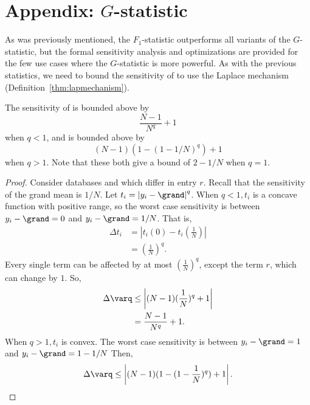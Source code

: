 \section{Appendix: $G$-statistic}\label{sec:Gapp}
As was previously mentioned, the $F_1$-statistic outperforms all variants of the $G$-statistic, but the formal sensitivity analysis and optimizations are provided for the few use cases where the $G$-statistic is more powerful. 
  As with the previous statistics, we need to bound the sensitivity of \varq to use the Laplace mechanism (Definition~\ref{thm:lapmechanism}).

\begin{theorem} \label{thm:varqSens} 
The sensitivity of \varq is bounded above by
$$ \frac{N-1}{N^q} + 1 $$
when $q<1$, and is bounded above by
$$ (N-1)(1-(1-1/N)^q) + 1 $$
when $q>1$. Note that these both give a bound of $2-1/N$ when $q=1$.
\end{theorem}

\begin{proof}
Consider databases \x and \xprime which differ in entry $r$. Recall that the sensitivity of the grand mean is $1/N$. Let $t_i = \left\vert  y_i - \grand \right\vert ^q$. When $q<1, t_i$ is a concave function with positive range, so the worst case sensitivity is between $ y_i - \grand = 0$ and $ y_i - \grand = 1/N$. That is, 
\begin{align*}
\Delta t_i &= \left\vert t_{i}(0) - t_i\left(\frac{1}{N}\right) \right\vert \\
	&= \left( \frac{1}{N} \right)^q.
\end{align*}
%
Every single term can be affected by at most $\left( \frac{1}{N} \right)^q$, except the term $r$, which can change by $1$. So, 
\begin{align*}
\Delta \varq &\le \left\vert (N-1)(\frac{1}{N})^q + 1 \right\vert \\
	&= \frac{N-1}{N^q} + 1.
\end{align*}
%
When $q>1, t_i$ is convex. The worst case sensitivity is between  $y_i - \grand = 1$ and $y_i - \grand = 1-1/N$ Then,
\begin{align*}
\Delta \varq \le \left\vert (N-1)(1-(1-\frac{1}{N})^q) + 1 \right\vert.
\end{align*}
\end{proof}


